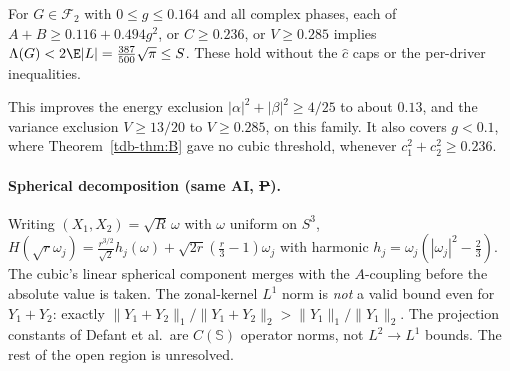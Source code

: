 \begin{theorem}[\st{P}+\st{C (AI)}]\label{tdb-thm:coldstart}
For $G\in\mathcal F_2$ with $0\le g\le0.164$ and all complex phases, each of $A+B\ge0.116+0.494g^2$, or $C\ge0.236$, or $V\ge0.285$ implies
$\Lambda(G)<2\E|L|=\frac{387}{500}\sqrt\pi\le S$. These hold without the $\hat c$ caps or the per-driver inequalities.
\end{theorem}
This improves the energy exclusion $|\alpha|^2+|\beta|^2\ge4/25$ to about $0.13$, and the variance exclusion $V\ge13/20$ to $V\ge0.285$, on this family. It also
covers $g<0.1$, where Theorem~\ref{tdb-thm:B} gave no cubic threshold, whenever $c_1^2+c_2^2\ge0.236$.

\paragraph{Spherical decomposition (same AI, \st{P}).} Writing $(X_1,X_2)=\sqrt R\,\omega$ with $\omega$ uniform on $S^3$,
$H(\sqrt r\omega_j)=\frac{r^{3/2}}{\sqrt2}h_j(\omega)+\sqrt{2r}(\frac r3-1)\omega_j$ with harmonic $h_j=\omega_j(|\omega_j|^2-\frac23)$. The cubic's linear spherical
component merges with the $A$-coupling before the absolute value is taken. The zonal-kernel $L^1$ norm is \emph{not} a valid bound even for $Y_1+Y_2$:
exactly $\|Y_1+Y_2\|_1/\|Y_1+Y_2\|_2>\|Y_1\|_1/\|Y_1\|_2$. The projection constants of Defant et al.\ are $C(\mathbb S)$ operator norms, not $L^2\to L^1$ bounds.
The rest of the open region is unresolved.

